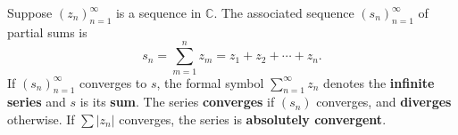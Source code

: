 Suppose $(z_n)_{n=1}^{\infty}$ is a sequence in $\mathbb{C}$. The associated sequence $(s_n)_{n=1}^{\infty}$ of partial sums is
$$s_n = \sum_{m=1}^{n} z_m = z_1 + z_2 + \cdots + z_n.$$
If $(s_n)_{n=1}^{\infty}$ converges to $s$, the formal symbol $\sum_{n=1}^{\infty} z_n$ denotes the \textbf{infinite series} and $s$ is its \textbf{sum}. The series \textbf{converges} if $(s_n)$ converges, and \textbf{diverges} otherwise. If $\sum |z_n|$ converges, the series is \textbf{absolutely convergent}.
